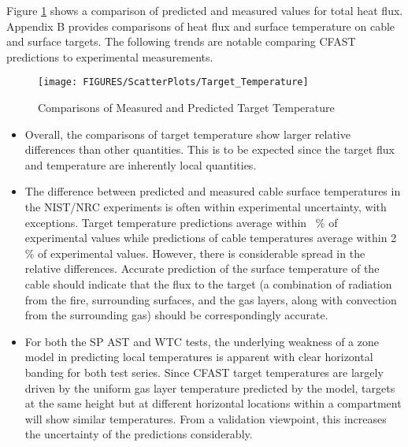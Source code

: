 Figure \ref{fig:Target_Temperature_Scatter} shows a comparison of predicted and measured values for total heat flux. Appendix B provides comparisons of heat flux and surface temperature on cable and surface targets.  The following trends are notable comparing CFAST predictions to experimental measurements.
\label{Target Temperature}

\begin{figure}
\begin{center}
\texttt{[image: FIGURES/ScatterPlots/Target\_Temperature]}
\end{center}
\caption{Comparisons of Measured and Predicted Target Temperature} \label{fig:Target_Temperature_Scatter}
\end{figure}

\begin{itemize}
\item Overall, the comparisons of target temperature show larger relative differences than other quantities. This is to be expected since the target flux and temperature are inherently local quantities.
\item The difference between predicted and measured cable surface temperatures in the NIST/NRC experiments is often within experimental uncertainty, with exceptions.  Target temperature predictions average within \Targtempavg ~\% of experimental values while predictions of cable temperatures average within 2 \% of experimental values.  However, there is considerable spread in the relative differences.  Accurate prediction of the surface temperature of the cable should indicate that the flux to the target (a combination of radiation from the fire, surrounding surfaces, and the gas layers, along with convection from the surrounding gas) should be correspondingly accurate.
\item For both the SP AST and WTC tests, the underlying weakness of a zone model in predicting local temperatures is apparent with clear horizontal banding for both test series.  Since CFAST target temperatures are largely driven by the uniform gas layer temperature predicted by the model, targets at the same height but at different horizontal locations within a compartment will show similar temperatures.  From a validation viewpoint, this increases the uncertainty of the predictions considerably.
\end{itemize}


